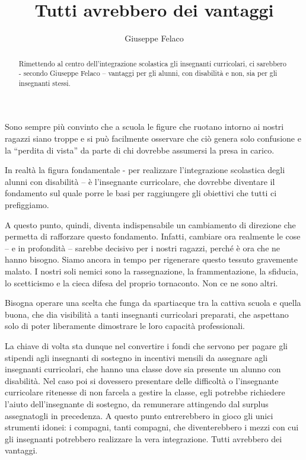 \author{Giuseppe Felaco}
\title{Tutti avrebbero dei vantaggi}
\label{cha:felaco260413}
\begin{abstract}
Rimettendo al centro dell’integrazione scolastica gli insegnanti curricolari, ci sarebbero - secondo Giuseppe Felaco -- vantaggi per gli alunni, con disabilità e non, sia per gli insegnanti stessi. 
\end{abstract}
\maketitle
Sono sempre più convinto che a scuola le figure che ruotano intorno ai nostri ragazzi siano troppe e si può facilmente osservare che ciò genera solo confusione e la “perdita di vista” da parte di chi dovrebbe assumersi la presa in carico.

In realtà la figura fondamentale - per realizzare l'integrazione scolastica degli alunni con disabilità – è l'insegnante curricolare, che dovrebbe diventare il fondamento sul quale porre le basi per raggiungere gli obiettivi che tutti ci prefiggiamo.

A questo punto, quindi, diventa indispensabile un cambiamento di direzione che permetta di rafforzare questo fondamento. Infatti, cambiare ora realmente le cose – e in profondità – sarebbe decisivo per i nostri ragazzi, perché è ora che ne hanno bisogno. Siamo ancora in tempo per rigenerare questo tessuto gravemente malato. I nostri soli nemici sono la rassegnazione, la frammentazione, la sfiducia, lo scetticismo e la cieca difesa del proprio tornaconto. Non ce ne sono altri.

Bisogna operare una scelta che funga da spartiacque tra la cattiva scuola e quella buona, che dia visibilità a tanti insegnanti curricolari preparati, che aspettano solo di poter liberamente dimostrare le loro capacità professionali.

La chiave di volta sta dunque nel convertire i fondi che servono per pagare gli stipendi agli insegnanti di sostegno in incentivi mensili da assegnare agli insegnanti curricolari, che hanno una classe dove sia presente un alunno con disabilità. Nel caso poi si dovessero presentare delle difficoltà o l'insegnante curricolare ritenesse di non farcela a gestire la classe, egli potrebbe richiedere l'aiuto dell'insegnante di sostegno, da remunerare attingendo dal surplus assegnatogli in precedenza. A questo punto entrerebbero in gioco gli unici strumenti idonei: i compagni, tanti compagni, che diventerebbero i mezzi con cui gli insegnanti potrebbero realizzare la vera integrazione.
Tutti avrebbero dei vantaggi.

